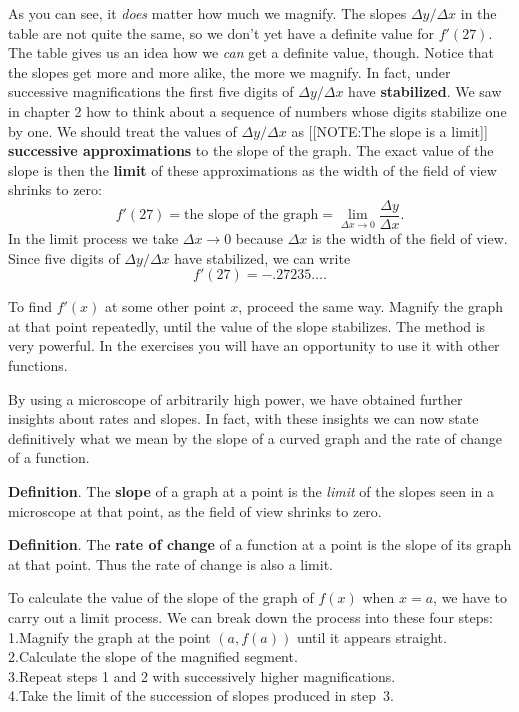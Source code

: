 As you can see, it {\em does\/} matter how much we magnify.  The
slopes $\Delta y/\Delta x$ in the table are not quite the same, so we
don't yet have a definite value for $f'(27)$.  The table gives us an
idea how we {\em can\/} get a definite value, though.  Notice that the
slopes get more and more alike, the more we magnify.  In fact, under
successive magnifications the first five digits of $\Delta y/\Delta x$
have {\bf stabilized}. We saw in chapter 2 how to
think about a sequence of numbers whose digits stabilize one by one.
We should treat the values of $\Delta y/\Delta x$ as [[NOTE:The slope is
  a limit]] {\bf successive approximations} to the slope of the graph.  The exact value of the
slope is then the {\bf limit} of these approximations as
the width of the field of view shrinks to zero:
\[
f'(27) = \mbox{the slope of the graph} = 
		\lim_{\Delta x \to 0}\dfrac{\Delta y}{\Delta x}.
\]
In the limit process we take $\Delta x \to 0$ because $\Delta x$ is
the width of the field of view.  Since five digits of $\Delta y/\Delta
x$ have stabilized, we can write
\[
f'(27) = -.27235\ldots .
\]


To find $f'(x)$ at some other point $x$, proceed the same way.
Magnify the graph at that point repeatedly, until the value of the
slope stabilizes.  The method is very powerful.  In the exercises you
will have an opportunity to use it with other functions.



By using a microscope of arbitrarily high power, we have obtained
further insights about rates and slopes.  In fact, with these insights
we can now state definitively what we mean by the slope of a curved
graph and the rate of change of a function.

\begin{observation}

{\bf Definition}.  The {\bf slope} of a graph at a point
is the {\em limit\/} of the slopes seen in a microscope at that point,
as the field of view shrinks to zero.


{\bf Definition}.  The {\bf rate of change} of a
function at a point is the slope of its graph at that point.  Thus the
rate of change is also a limit.
\end{observation}

To calculate the value of the slope of the graph of $f(x)$ when $x =
a$, we have to carry out a limit process.  We can break down the
process into these four steps: \\[5pt] 
1.\enskip Magnify the graph at the point $(a, f(a))$ until it appears 
straight.\\[3pt] 
2.\enskip Calculate the slope of the magnified segment.\\[3pt] 
3.\enskip Repeat steps 1 and 2 with successively higher 
magnifications.\\[3pt]
4.\enskip Take the limit of the succession of slopes produced in 
step~3.


